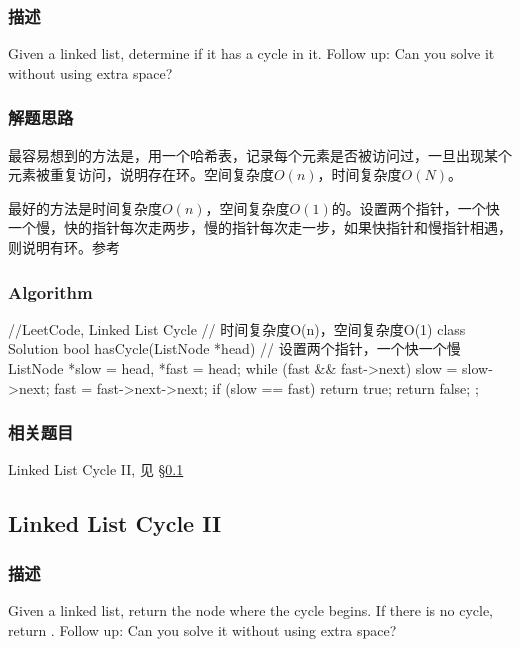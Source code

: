 \subsubsection{描述}
Given a linked list, determine if it has a cycle in it.
Follow up:
Can you solve it without using extra space?


\subsubsection{解题思路}
最容易想到的方法是，用一个哈希表，记录每个元素是否被访问过，一旦出现某个元素被重复访问，说明存在环。空间复杂度$O(n)$，时间复杂度$O(N)$。

最好的方法是时间复杂度$O(n)$，空间复杂度$O(1)$的。设置两个指针，一个快一个慢，快的指针每次走两步，慢的指针每次走一步，如果快指针和慢指针相遇，则说明有环。参考


\subsubsection{Algorithm}
\begin{Code}
	//LeetCode, Linked List Cycle
	// 时间复杂度O(n)，空间复杂度O(1)
	class Solution {
		bool hasCycle(ListNode *head) {
			// 设置两个指针，一个快一个慢
			ListNode *slow = head, *fast = head;
			while (fast && fast->next) {
				slow = slow->next;
				fast = fast->next->next;
				if (slow == fast) return true;
			}
			return false;
		}
	};
\end{Code}


\subsubsection{相关题目}
\begindot
\item Linked List Cycle II, 见 \S \ref{sec:Linked-List-Cycle-II}
\myenddot


\subsection{Linked List Cycle II}
\label{sec:Linked-List-Cycle-II}

\subsubsection{描述}
Given a linked list, return the node where the cycle begins. If there is no 
cycle, return .
Follow up:
Can you solve it without using extra space?

